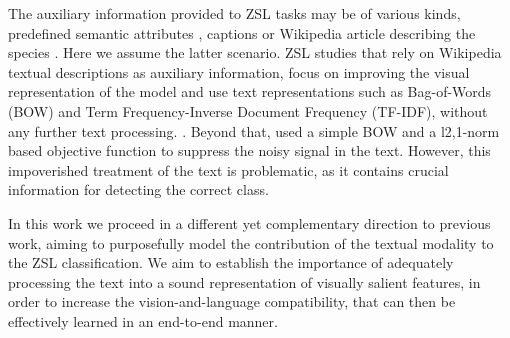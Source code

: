 \documentclass[11pt,a4paper]{article}
\begin{document}





The auxiliary information provided to ZSL tasks may be of various kinds, predefined semantic attributes \cite{lampert2009learning,changpinyo2020classifier,atzmon2018probabilistic}, captions \cite{Xian_2018_CVPR,Sariyildiz_2019_CVPR} or Wikipedia article describing the species \cite{elhoseiny2017link}.
Here we assume the latter scenario. ZSL studies that rely on Wikipedia textual descriptions  as auxiliary information, focus on improving the visual representation of the model and use text representations such as Bag-of-Words (BOW) and Term Frequency-Inverse Document Frequency (TF-IDF), without any further text processing.  \cite{lei2015predicting,elhoseiny2013write,elhoseiny2016write,elhoseiny2017link,zhu2018generative}. Beyond that,  \citet{qiao2016less} used a simple BOW and a l2,1-norm based objective function to suppress the noisy signal in the text. However, this impoverished treatment of the text  is problematic, as it contains crucial information for detecting the correct class. 

In this work we proceed in  a different yet complementary direction to previous work, aiming to purposefully  model the contribution of the textual modality to the ZSL classification.
We aim to establish the importance of adequately processing the text into a sound representation of  visually salient features, in order to  increase the vision-and-language compatibility, that can then be effectively learned in an end-to-end manner.
\end{document}
